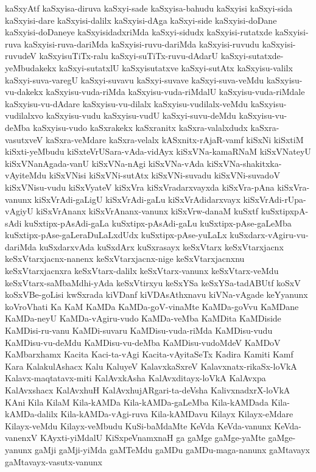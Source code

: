 {kaSxyAtf
kaSxyisa-diruva
kaSxyi-sade
kaSxyisa-bahudu
kaSxyisi
kaSxyi-sida
kaSxyisi-dare
kaSxyisi-dalilx
kaSxyisi-dAga
kaSxyi-side
kaSxyisi-doDane
kaSxyisi-doDaneye
kaSxyisidadxriMda
kaSxyi-sidudx
kaSxyisi-rutatxde
kaSxyisi-ruva
kaSxyisi-ruva-dariMda
kaSxyisi-ruvu-dariMda
kaSxyisi-ruvudu
kaSxyisi-ruvudeV
kaSxyisuTiTx-ralu
kaSxyi-suTiTx-ruvu-dAdarU
kaSxyi-sutatxde-yeMbudakekx
kaSxyi-sutatxlU
kaSxyisutatxve
kaSxyi-sutAtx
kaSxyisu-valilx
kaSxyi-suva-varegU
kaSxyi-suvavu
kaSxyi-suvave
kaSxyi-suva-veMdu
kaSxyisu-vu-dakekx
kaSxyisu-vuda-riMda
kaSxyisu-vuda-riMdalU
kaSxyisu-vuda-riMdale
kaSxyisu-vu-dAdare
kaSxyisu-vu-dilalx
kaSxyisu-vudilalx-veMdu
kaSxyisu-vudilalxvo
kaSxyisu-vudu
kaSxyisu-vudU
kaSxyi-suvu-deMdu
kaSxyisu-vu-deMba
kaSxyisu-vudo
kaSxrakekx
kaSxranitx
kaSxra-valalxdudx
kaSxra-vasutxveV
kaSxra-veMdare
kaSxra-velalx
kASxnitx-rAjaR-vamf
kiSxNi
kiSxtiM
kiSxti-yeMbudu
kiSxteVrUSara-vAda-vidAyx
kiSxVNa-kamaRNaM
kiSxVNateyU
kiSxVNanAgada-vanU
kiSxVNa-nAgi
kiSxVNa-vAda
kiSxVNa-shakitxka-vAyiteMdu
kiSxVNisi
kiSxVNi-sutAtx
kiSxVNi-suvadu
kiSxVNi-suvadoV
kiSxVNisu-vudu
kiSxVyateV
kiSxVra
kiSxVradarxvayxda
kiSxVra-pAna
kiSxVra-vanunx
kiSxVrAdi-gaLigU
kiSxVrAdi-gaLu
kiSxVrAdidarxvayx
kiSxVrAdi-rUpa-vAgiyU
kiSxVrAnanx
kiSxVrAnanx-vanunx
kiSxVrw-danaM
kuSxtf
kuSxtipxpA-sAdi
kuSxtipx-pAsAdi-gaLa
kuSxtipx-pAsAdi-gaLu
kuSxtipx-pAse-gaLeMba
kuSxtipx-pAse-gaLeraDuLaLxdUdx
kuSxtipx-pAse-yuLaLx
kuSxdarx-vAgiru-vu-dariMda
kuSxdarxvAda
kuSxdArx
kuSxrasayx
keSxVtarx
keSxVtarxjacnx
keSxVtarxjacnx-nanenx
keSxVtarxjacnx-nige
keSxVtarxjacnxnu
keSxVtarxjacnxra
keSxVtarx-dalilx
keSxVtarx-vanunx
keSxVtarx-veMdu
keSxVtarx-saMbaMdhi-yAda
keSxVtirxyu
keSxYSa
keSxYSa-tadABUtf
koSxV
koSxVBe-goLisi
kwSxrada
kiVDanf
kiVDAsAthxnavu
kiVNa-vAgade
keYyanunx
koVroVhati
Ka
KaM
KaMDa
KaMDa-goV-vinaMte
KaMDa-goVvu
KaMDane
KaMDa-neyU
KaMDa-vAgiru-vudo
KaMDa-veMba
KaMDita
KaMDiside
KaMDisi-ru-vanu
KaMDi-suvaru
KaMDisu-vuda-riMda
KaMDisu-vudu
KaMDisu-vu-deMdu
KaMDisu-vu-deMba
KaMDisu-vudoMdeV
KaMDoV
KaMbarxhamx
Kacita
Kaci-ta-vAgi
Kacita-vAyitaSeTx
Kadira
Kamiti
Kamf
Kara
KalakulAshacx
Kalu
KaluyeV
KalavxkaSxreV
Kalavxnatx-rikaSx-loVkA
Kalavx-maqtatavx-miti
KalAvxkAsha
KalAvxditayx-loVkA
KalAvxpa
KalAvxshacx
KalAvxhuH
KalAvxhujARgari-ta-deVsha
KalivxnadxrX-loVkA
KAni
Kila
KilaM
Kila-kAMDa
Kila-kAMDa-gaLeMba
Kila-kAMDada
Kila-kAMDa-dalilx
Kila-kAMDa-vAgi-ruva
Kila-kAMDavu
Kilayx
Kilayx-eMdare
Kilayx-veMdu
Kilayx-veMbudu
KuSi-baMdaMte
KeVda
KeVda-vanunx
KeVda-vanenxV
KAyxti-yiMdalU
KiSxpeVnamxnaH
ga
gaMge
gaMge-yaMte
gaMge-yanunx
gaMji
gaMji-yiMda
gaMTeMdu
gaMDu
gaMDu-maga-nanunx
gaMtavayx
gaMtavayx-vasutx-vanunx
}
